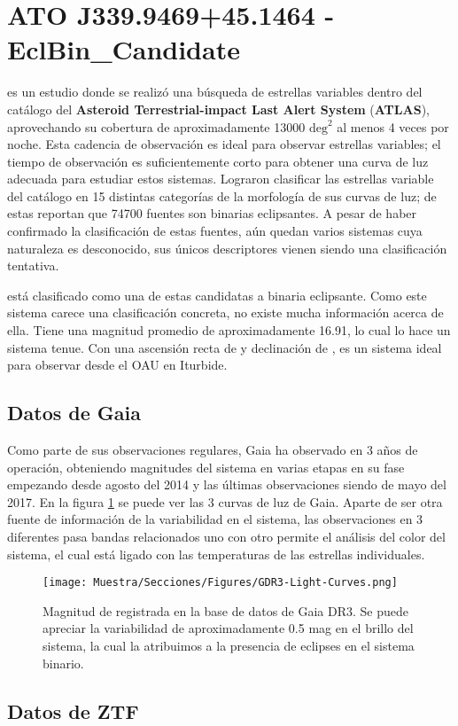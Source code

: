 \section{ATO J339.9469+45.1464 - EclBin\_Candidate}

\autocite{atlasATOObjectDiscovery} es un estudio donde se realizó una búsqueda de
estrellas variables dentro del catálogo del \textbf{Asteroid Terrestrial-impact
Last Alert System} (\textbf{ATLAS}), aprovechando su cobertura de
aproximadamente \num{13000} $\mathrm{deg}^2$ al menos 4 veces por noche. Esta
cadencia de observación es ideal para observar estrellas variables; el tiempo de
observación es suficientemente corto para obtener una curva de luz adecuada para
estudiar estos sistemas. Lograron clasificar las estrellas variable del catálogo
en 15 distintas categorías de la morfología de sus curvas de luz; de estas
reportan que \num{74700} fuentes son binarias eclipsantes. A pesar de haber
confirmado la clasificación de estas fuentes, aún quedan varios sistemas cuya
naturaleza es desconocido, sus únicos descriptores vienen siendo una
clasificación tentativa.

\textbf{\atoObjId} está clasificado como una de estas candidatas a binaria
eclipsante. Como este sistema carece una clasificación concreta, no existe mucha
información acerca de ella. Tiene una magnitud promedio de aproximadamente
\num{16.91}, lo cual lo hace un sistema tenue. Con una ascensión recta de
 y declinación de , \textbf{\atoObjId}
es un sistema ideal para observar desde el OAU en Iturbide.

\subsection{Datos de Gaia}

Como parte de sus observaciones regulares, Gaia ha observado \atoObjId en 3 años
de operación, obteniendo magnitudes del sistema en varias etapas en su fase
empezando desde agosto del 2014 y las últimas observaciones siendo de mayo del
2017. En la figura \ref{gdr3AtoObjLightCurves} se puede ver las 3 curvas de luz
de Gaia. Aparte de ser otra fuente de información de la variabilidad en el
sistema, las observaciones en 3 diferentes pasa bandas relacionados uno con otro
permite el análisis del color del sistema, el cual está ligado con las
temperaturas de las estrellas individuales.

\begin{figure}[!ht]
	\centering
	\texttt{[image: Muestra/Secciones/Figures/GDR3-Light-Curves.png]}

	\caption{Magnitud de \atoObjId registrada en la base de datos de Gaia DR3.
	Se puede apreciar la variabilidad de aproximadamente 0.5 mag en el brillo
	del sistema, la cual la atribuimos a la presencia de eclipses en el sistema
	binario. \autocite{gdr3ReleaseDocumentation}}
	\label{gdr3AtoObjLightCurves}
\end{figure}

\subsection{Datos de ZTF}
